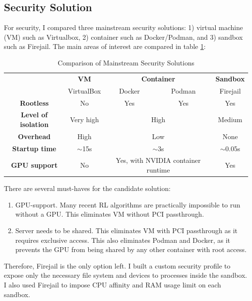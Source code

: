 \documentclass[fyp]{socreport}
\begin{document}
\subsection{Security Solution}
For security, I compared three mainstream security solutions: 1) virtual machine (VM) such as Virtualbox, 2) container such as Docker/Podman, and 3) sandbox such as Firejail. The main areas of interest are compared in table \ref{tab:security-solutions}:

\begin{table}[H]
\centering
\begin{tabular}{|c|c|cc|c|}
\hline
\multirow{2}{*}{} & \textbf{VM} & \multicolumn{2}{c|}{\textbf{Container}} & \textbf{Sandbox} \\ \cline{2-5} 
 & VirtualBox & \multicolumn{1}{c|}{Docker} & Podman & Firejail \\ \hline
\textbf{Rootless} & No & \multicolumn{1}{c|}{Yes} & Yes & Yes \\ \hline
\textbf{Level of isolation} & Very high & \multicolumn{2}{c|}{High} & Medium \\ \hline
\textbf{Overhead} & High & \multicolumn{2}{c|}{Low} & None \\ \hline
\textbf{Startup time} & $\sim$15s & \multicolumn{2}{c|}{$\sim$3s} & $\sim$0.05s \\ \hline
\textbf{GPU support} & No & \multicolumn{2}{c|}{Yes, with NVIDIA container runtime} & Yes \\ \hline
\end{tabular}
\caption{Comparison of Mainstream Security Solutions}
\label{tab:security-solutions}
\end{table}

There are several must-haves for the candidate solution:

\begin{enumerate}
    \item GPU-support. Many recent RL algorithms are practically impossible to run without a GPU. This eliminates VM without PCI passthrough.
    \item Server needs to be shared. This eliminates VM with PCI passthrough as it requires exclusive access. This also eliminates Podman and Docker, as it prevents the GPU from being shared by any other container with root access.
\end{enumerate}

Therefore, Firejail is the only option left. I built a custom security profile to expose only the necessary file system and devices to processes inside the sandbox. I also used Firejail to impose CPU affinity and RAM usage limit on each sandbox.
\end{document}
